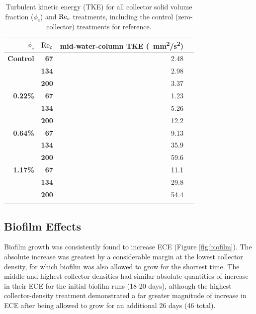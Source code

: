 \documentclass[geosciences,article,submit,moreauthors,pdftex]{Definitions/mdpi}
\begin{document}
\begin{table}[h]
\caption{Turbulent kinetic energy (TKE) for all collector solid volume fraction ($\phi_c$) and $\mathrm{Re}_c$ treatments, including the control (zero-collector) treatments for reference.}
\centering
\begin{tabular}{>{\bfseries}r>{\bfseries}rrr}
\toprule
\textbf{$\phi_c$}&\textbf{$\mathrm{Re}_c$}&\textbf{mid-water-column TKE (\SI{}{\milli\metre^2/\second^2})}\\
\midrule
Control &   67  & \num{2.48}\\
        &   134 & \num{2.98}\\
        &   200 & \num{3.37}\\
\midrule
0.22\% &   67  & \num{1.23}\\
        &   134 & \num{5.26}\\
        &   200 & \num{12.2}\\
\midrule
0.64\% &   67  & \num{9.13}\\
        &   134 & \num{35.9}\\
        &   200 & \num{59.6}\\
\midrule
1.17\%  &   67  & \num{11.1}\\
        &   134 & \num{29.8}\\
        &   200 & \num{54.4}\\
\bottomrule
\label{tbl:turbulence}
\end{tabular}
\end{table}

\subsection{Biofilm Effects}

Biofilm growth was consistently found to increase ECE (Figure \ref{fig:biofilm}). The absolute increase was greatest by a considerable margin at the lowest collector density, for which biofilm was also allowed to grow for the shortest time. The middle and highest collector densities had similar absolute quantities of increase in their ECE for the initial biofilm runs (18-20 days), although the highest collector-density treatment demonstrated a far greater magnitude of increase in ECE after being allowed to grow for an additional 26 days (46 total).
\end{document}
